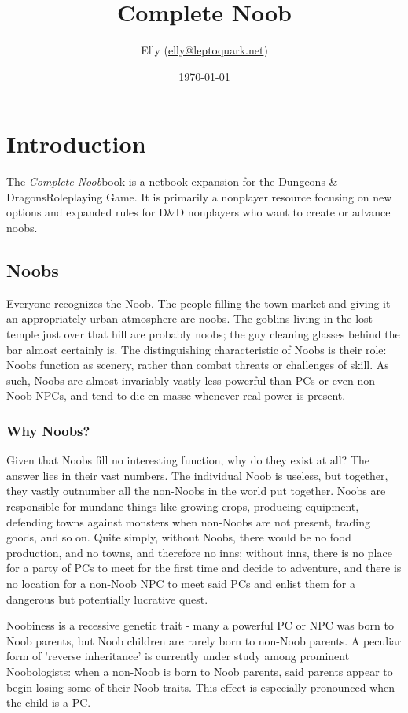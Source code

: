\documentclass[11pt]{report}
\title{Complete Noob}
\author{Elly (\url{elly@leptoquark.net})}
\date{\today}
\begin{document}
\newcommand{\btitle}[0]{\textit{Complete Noob}}
\newcommand{\dandd}[0]{{\sc Dungeons \& Dragons}}

\maketitle
\tableofcontents

\chapter{Introduction}
The \btitle book is a netbook expansion for the \dandd Roleplaying Game. It is
primarily a nonplayer resource focusing on new options and expanded rules for
D\&D nonplayers who want to create or advance noobs.

\section{Noobs}
Everyone recognizes the Noob. The people filling the town market and giving it
an appropriately urban atmosphere are noobs. The goblins living in the lost
temple just over that hill are probably noobs; the guy cleaning glasses behind
the bar almost certainly is. The distinguishing characteristic of Noobs is their
role: Noobs function as scenery, rather than combat threats or challenges of
skill. As such, Noobs are almost invariably vastly less powerful than PCs or
even non-Noob NPCs, and tend to die en masse whenever real power is present.

\subsection{Why Noobs?}
Given that Noobs fill no interesting function, why do they exist at all? The
answer lies in their vast numbers. The individual Noob is useless, but together,
they vastly outnumber all the non-Noobs in the world put together. Noobs are
responsible for mundane things like growing crops, producing equipment,
defending towns against monsters when non-Noobs are not present, trading goods,
and so on. Quite simply, without Noobs, there would be no food production, and
no towns, and therefore no inns; without inns, there is no place for a party of
PCs to meet for the first time and decide to adventure, and there is no location
for a non-Noob NPC to meet said PCs and enlist them for a dangerous but
potentially lucrative quest.

Noobiness is a recessive genetic trait - many a powerful PC or NPC was born to
Noob parents, but Noob children are rarely born to non-Noob parents. A peculiar
form of 'reverse inheritance' is currently under study among prominent
Noobologists: when a non-Noob is born to Noob parents, said parents appear to
begin losing some of their Noob traits. This effect is especially pronounced
when the child is a PC.
\end{document}
